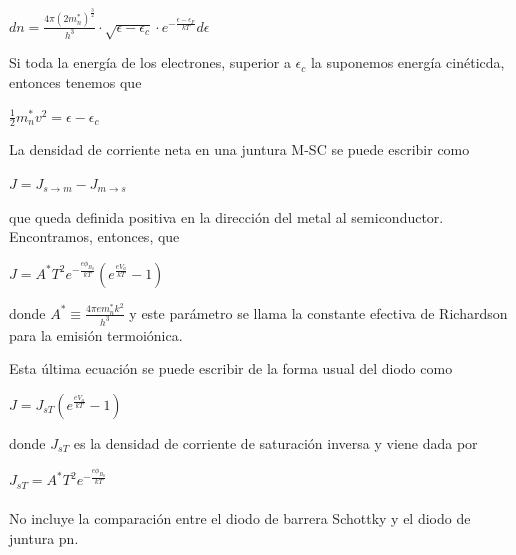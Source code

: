 \documentclass[oneside]{book}
\numberwithin{equation}{section}
\numberwithin{figure}{section}
\numberwithin{table}{section}
\begin{document}
			\begin{center}
				$dn=\frac{4 \pi (2m^{\ast}_n)^{\frac{3}{2}}}{h^3} \cdot \sqrt{\epsilon-\epsilon_c} \cdot e^{-\frac{\epsilon-\epsilon_F}{kT}} d\epsilon$
			\end{center}

			Si toda la energía de los electrones, superior a $\epsilon _c$ la suponemos energía cinéticda, entonces tenemos que
			
			\begin{center}
				$\frac{1}{2} m_n^{\ast} v^2=\epsilon-\epsilon_c$
			\end{center}
			
			La densidad de corriente neta en una juntura M-SC se puede escribir como
			
			\begin{center}
				$J=J_{s \rightarrow m}-J_{m \rightarrow s}$
			\end{center}
			
			que queda definida positiva en la dirección del metal al semiconductor. Encontramos, entonces, que

			\begin{center}
				$J=A^{\ast}T^2 e^{-\frac{e\phi _{B_0}}{kT}} (e^{\frac{eV_a}{kT}} -1)$
			\end{center}

		donde $A^{\ast} \equiv \frac{4 \pi e m_n^{\ast} k^2}{h^3}$ y este parámetro se llama la constante efectiva de Richardson para la emisión termoiónica.

		Esta última ecuación se puede escribir de la forma usual del diodo como
		
		\begin{center}
			$J=J_{sT}(e^{\frac{eV_a}{kT}}-1)$
		\end{center}
		
		donde $J_{sT}$ es la densidad de corriente de saturación inversa y viene dada por
		
		\begin{center}
			$J_{sT}=A^{\ast}T^2 e^{-\frac{e \phi _{B_0}}{kT}}$
		\end{center}

		\paragraph{}

			\scriptsize No incluye la comparación entre el diodo de barrera Schottky y el diodo de juntura pn.

			\normalsize
\end{document}
